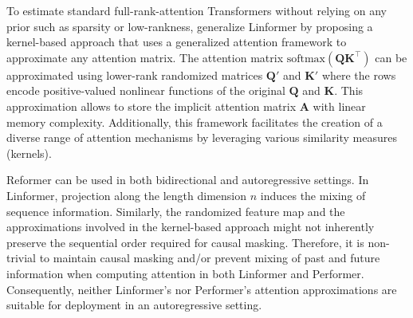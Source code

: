 


To estimate standard full-rank-attention Transformers without relying on any prior such as sparsity or low-rankness, \citet{choromanski2020rethinking} generalize Linformer by proposing a kernel-based approach that uses a generalized attention framework to approximate any attention matrix. The attention matrix $\text{softmax}(\bm{Q}\bm{K}^{\top})$ can be approximated using lower-rank randomized matrices $\bm{Q'}$ and $\bm{K'}$ where the rows encode positive-valued nonlinear functions of the original $\bm{Q}$ and $\bm{K}$. This approximation allows to store the implicit attention matrix $\bm{A}$ with linear memory complexity. Additionally, this framework facilitates the creation of a diverse range of attention mechanisms by leveraging various similarity measures (kernels). 


Reformer can be used in both bidirectional and autoregressive settings. In Linformer, projection along the length dimension $n$ induces the mixing of sequence information. Similarly, the randomized feature map and the approximations involved in the kernel-based approach might not inherently preserve the sequential order required for causal masking. Therefore, it is non-trivial to maintain causal masking and/or prevent mixing of past and future information when computing attention in both Linformer and Performer. Consequently, neither Linformer's nor Performer's attention approximations are suitable for deployment in an autoregressive setting.

